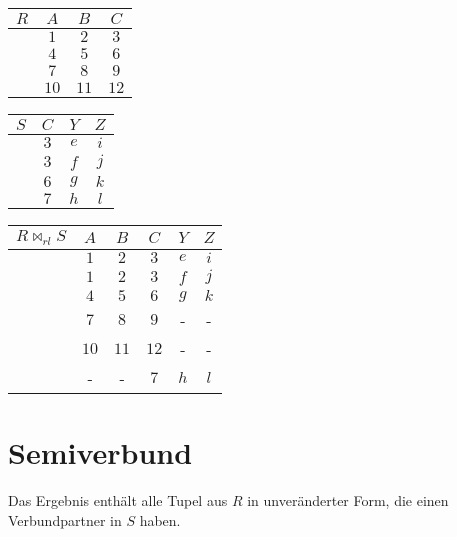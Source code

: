 \documentclass[12pt,a4paper,notitlepage,leqno]{article}
\begin{document}
\begin{center}
    \begin{tabular}{c|ccc}
        $R$ & $A$ & $B$ & $C$ \\\hline
         & $1$ & $2$ & $3$ \\
         & $4$ & $5$ & $6$ \\
         & $7$ & $8$ & $9$ \\
         & $10$ & $11$ & $12$
    \end{tabular}
    \hspace{1cm}
    \begin{tabular}{c|ccc}
        $S$ & $C$ & $Y$ & $Z$ \\\hline
         & $3$ & $e$ & $i$ \\
         & $3$ & $f$ & $j$ \\
         & $6$ & $g$ & $k$ \\
         & $7$ & $h$ & $l$
    \end{tabular}
    \hspace{1cm}
    \begin{tabular}{c|ccccc}
        $R \bowtie_{rl} S$ & $A$ & $B$ & $C$ & $Y$ & $Z$ \\\hline
         & $1$ & $2$ & $3$ & $e$ & $i$ \\
         & $1$ & $2$ & $3$ & $f$ & $j$ \\
         & $4$ & $5$ & $6$ & $g$ & $k$\\
         & $7$ & $8$ & $9$ & - & - \\
         & $10$ & $11$ & $12$ & - & - \\
         & - & - &$7$ & $h$ & $l$
    \end{tabular}
\end{center}

\section*{Semiverbund}

Das Ergebnis enthält alle Tupel aus $R$ in unveränderter Form, die einen Verbundpartner in $S$ haben.
\end{document}
